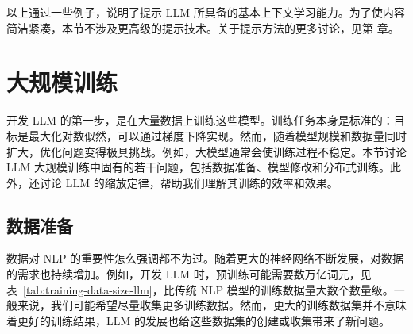 以上通过一些例子，说明了提示 LLM 所具备的基本上下文学习能力。为了使内容简洁紧凑，本节不涉及更高级的提示技术。关于提示方法的更多讨论，见第 \ChapterLLMPrompting 章。


\section{大规模训练}
\label{sec:llm-training-at-scale}

\noindent 开发 LLM 的第一步，是在大量数据上训练这些模型。训练任务本身是标准的：目标是最大化对数似然，可以通过梯度下降实现。然而，随着模型规模和数据量同时扩大，优化问题变得极具挑战。例如，大模型通常会使训练过程不稳定。本节讨论 LLM 大规模训练中固有的若干问题，包括数据准备、模型修改和分布式训练。此外，还讨论 LLM 的缩放定律，帮助我们理解其训练的效率和效果。

\subsection{数据准备}

\noindent 数据对 NLP 的重要性怎么强调都不为过。随着更大的神经网络不断发展，对数据的需求也持续增加。例如，开发 LLM 时，预训练可能需要数万亿词元，见表~\ref{tab:training-data-size-llm}，比传统 NLP 模型的训练数据量大数个数量级。一般来说，我们可能希望尽量收集更多训练数据。然而，更大的训练数据集并不意味着更好的训练结果，LLM 的发展也给这些数据集的创建或收集带来了新问题。

